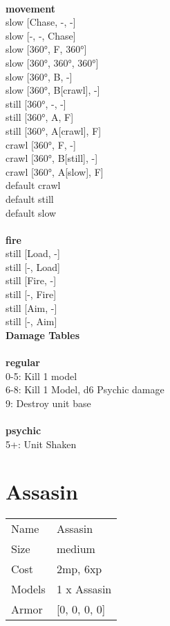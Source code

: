 \ \\ {\bf movement } \\
slow [Chase, -, -] \\
slow [-, -, Chase] \\
slow [360°, F, 360°] \\
slow [360°, 360°, 360°] \\
slow [360°, B, -] \\
slow [360°, B[crawl], -] \\
still [360°, -, -] \\
still [360°, A, F] \\
still [360°, A[crawl], F] \\
crawl [360°, F, -] \\
crawl [360°, B[still], -] \\
crawl [360°, A[slow], F] \\
default crawl \\
default still \\
default slow \\
\ \\ {\bf fire } \\
still [Load, -] \\
still [-, Load] \\
still [Fire, -] \\
still [-, Fire] \\
still [Aim, -] \\
still [-, Aim] \\


{\bf Damage Tables} \\
\ \\ {\bf regular } \\
0-5: Kill 1 model \\
6-8: Kill 1 Model, d6 Psychic damage \\
9: Destroy unit base \\
\ \\ {\bf psychic } \\
5+: Unit Shaken \\










\pagebreak\pagebreak

\section{ Assasin }

\begin{tabular}{ll}
  Name & Assasin \\
  Size & medium\\
  Cost & 2mp, 6xp\\
  Models & 1 x Assasin\\
  Armor & [0, 0, 0, 0]\\
\end{tabular}

